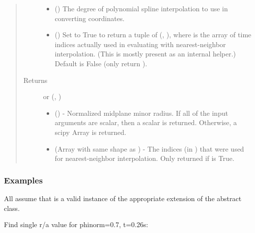 \documentclass[letterpaper,10pt,english]{sphinxmanual}
\begin{document}
\begin{fulllineitems}
\begin{fulllineitems}
\begin{quote}
\begin{description}
\begin{itemize}
\item {} 
 () \textendash{} The degree of polynomial spline interpolation to
use in converting coordinates.

\item {} 
 () \textendash{} Set to True to return a tuple of (,
), where  is the array of time indices
actually used in evaluating  with nearest-neighbor
interpolation. (This is mostly present as an internal helper.)
Default is False (only return ).

\end{itemize}

\item[{Returns}] \leavevmode

 or (, )
\begin{itemize}
\item {} 
 () - Normalized midplane minor
radius. If all of the input arguments are scalar, then a scalar
is returned. Otherwise, a scipy Array is returned.

\item {} 
 (Array with same shape as ) - The indices
(in ) that were used for
nearest-neighbor interpolation. Only returned if  is
True.

\end{itemize}


\end{description}\end{quote}
\subsubsection*{Examples}

All assume that  is a valid instance of the appropriate
extension of the {\hyperref[\detokenize{eqtools:eqtools.core.Equilibrium}]{}} abstract class.

Find single r/a value for phinorm=0.7, t=0.26s:


\end{fulllineitems}
\end{fulllineitems}
\end{document}
